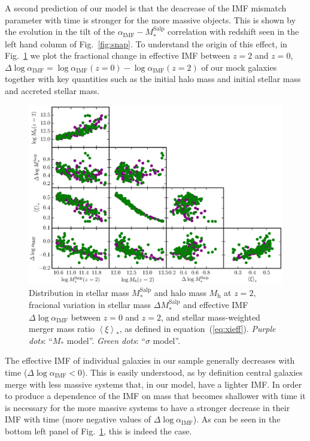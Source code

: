 \documentclass[usenatbib]{mnras}
\def\mhalo{M_{\mathrm{h}}}
\def\msalp{M_*^{\mathrm{Salp}}}
\def\aimf{\alpha_{\mathrm{IMF}}}
\def\Fref#1{Fig.~\ref{#1}\xspace}
\def\Eref#1{equation~(\ref{#1})\xspace}
\begin{document}
A second prediction of our model is that the deacrease of the IMF
mismatch parameter with time is stronger for the more massive
objects. This is shown by the evolution in the tilt of the
$\aimf-\msalp$ correlation with redshift seen in the left hand column
of \Fref{fig:snap}.  To understand the origin of this effect, in
\Fref{fig:cornerplot} we plot the fractional change in effective IMF
between $z=2$ and $z=0$,
$\Delta\log{\aimf}=\log{\aimf}(z=0)-\log{\aimf}(z=2)$ of our mock
galaxies together with key quantities such as the initial halo mass
and initial stellar mass and accreted stellar mass.
%
\begin{figure}
 \includegraphics[width=\textwidth]{cornerplot.eps}
 \caption{ 
   Distribution in stellar mass $\msalp$ and halo mass $\mhalo$ at $z=2$, fracional
   variation in stellar mass $\Delta\msalp$ and effective IMF $\Delta\log{\aimf}$ between $z=0$ and $z=2$, and stellar
   mass-weighted merger mass ratio $\left<\xi\right>_*$, as defined in \Eref{eq:xieff}.
   {\em Purple dots}: ``$M_*$ model''. {\em Green dots}: ``$\sigma$
   model''.  }
 \label{fig:cornerplot}
\end{figure}
%
The effective IMF of individual galaxies in our sample generally
decreases with time ($\Delta\log{\aimf}<0$). This is easily
understood, as by definition central galaxies merge with less massive
systems that, in our model, have a lighter IMF.  In order to produce a
dependence of the IMF on mass that becomes shallower with time it is
necessary for the more massive systems to have a stronger decrease in
their IMF with time (more negative values of $\Delta\log{\aimf}$).  As
can be seen in the bottom left panel of \Fref{fig:cornerplot}, this is
indeed the case.
\end{document}
